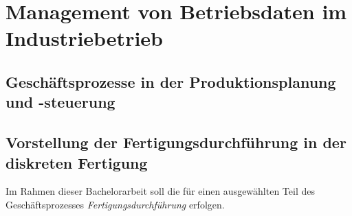 \section{Management von Betriebsdaten im Industriebetrieb}\label{sec:usecase}




\subsection{Geschäftsprozesse in der Produktionsplanung und -steuerung}


\subsection{Vorstellung der Fertigungsdurchführung in der diskreten Fertigung}





Im Rahmen dieser Bachelorarbeit soll die  für einen ausgewählten Teil des Geschäftsprozesses \textit{Fertigungsdurchführung} erfolgen.

